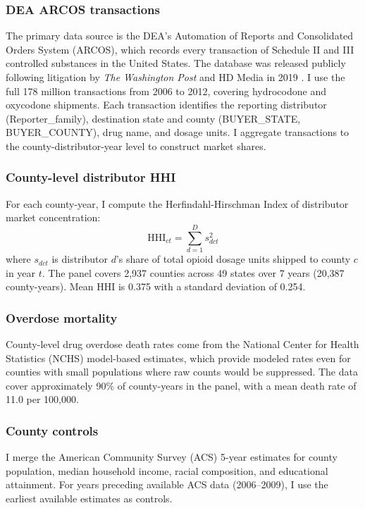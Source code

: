 \documentclass[12pt]{article}
\begin{document}
\subsubsection*{DEA ARCOS transactions} The primary data source is the DEA's Automation of Reports and Consolidated Orders System (ARCOS), which records every transaction of Schedule II and III controlled substances in the United States. The database was released publicly following litigation by \emph{The Washington Post} and HD Media in 2019 \citep{higham2019arcos}. I use the full 178 million transactions from 2006 to 2012, covering hydrocodone and oxycodone shipments. Each transaction identifies the reporting distributor (Reporter\_family), destination state and county (BUYER\_STATE, BUYER\_COUNTY), drug name, and dosage units. I aggregate transactions to the county-distributor-year level to construct market shares.

\subsubsection*{County-level distributor HHI} For each county-year, I compute the Herfindahl-Hirschman Index of distributor market concentration:
\begin{equation}
\text{HHI}_{ct} = \sum_{d=1}^{D} s_{dct}^2
\end{equation}
where $s_{dct}$ is distributor $d$'s share of total opioid dosage units shipped to county $c$ in year $t$. The panel covers 2,937 counties across 49 states over 7 years (20,387 county-years). Mean HHI is 0.375 with a standard deviation of 0.254.

\subsubsection*{Overdose mortality} County-level drug overdose death rates come from the National Center for Health Statistics (NCHS) model-based estimates, which provide modeled rates even for counties with small populations where raw counts would be suppressed. The data cover approximately 90\% of county-years in the panel, with a mean death rate of 11.0 per 100,000.

\subsubsection*{County controls} I merge the American Community Survey (ACS) 5-year estimates for county population, median household income, racial composition, and educational attainment. For years preceding available ACS data (2006--2009), I use the earliest available estimates as controls.
\end{document}
